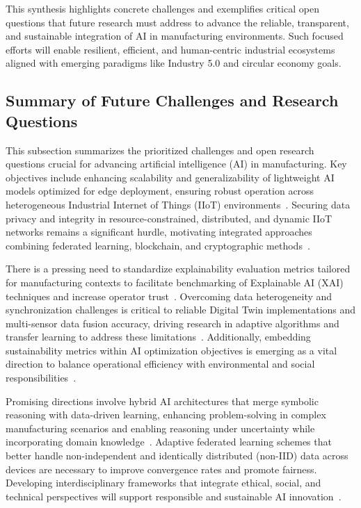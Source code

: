 \documentclass[sigconf]{acmart}
\begin{document}
This synthesis highlights concrete challenges and exemplifies critical open questions that future research must address to advance the reliable, transparent, and sustainable integration of AI in manufacturing environments. Such focused efforts will enable resilient, efficient, and human-centric industrial ecosystems aligned with emerging paradigms like Industry 5.0 and circular economy goals.

\subsection{Summary of Future Challenges and Research Questions}

This subsection summarizes the prioritized challenges and open research questions crucial for advancing artificial intelligence (AI) in manufacturing. Key objectives include enhancing scalability and generalizability of lightweight AI models optimized for edge deployment, ensuring robust operation across heterogeneous Industrial Internet of Things (IIoT) environments~\cite{ref30,ref38}. Securing data privacy and integrity in resource-constrained, distributed, and dynamic IIoT networks remains a significant hurdle, motivating integrated approaches combining federated learning, blockchain, and cryptographic methods~\cite{ref6,ref25,ref41}.

There is a pressing need to standardize explainability evaluation metrics tailored for manufacturing contexts to facilitate benchmarking of Explainable AI (XAI) techniques and increase operator trust~\cite{ref30,ref38}. Overcoming data heterogeneity and synchronization challenges is critical to reliable Digital Twin implementations and multi-sensor data fusion accuracy, driving research in adaptive algorithms and transfer learning to address these limitations~\cite{ref26,ref39}. Additionally, embedding sustainability metrics within AI optimization objectives is emerging as a vital direction to balance operational efficiency with environmental and social responsibilities~\cite{ref41,ref44}.

Promising directions involve hybrid AI architectures that merge symbolic reasoning with data-driven learning, enhancing problem-solving in complex manufacturing scenarios and enabling reasoning under uncertainty while incorporating domain knowledge~\cite{ref6,ref25}. Adaptive federated learning schemes that better handle non-independent and identically distributed (non-IID) data across devices are necessary to improve convergence rates and promote fairness. Developing interdisciplinary frameworks that integrate ethical, social, and technical perspectives will support responsible and sustainable AI innovation~\cite{ref25}.
\end{document}
